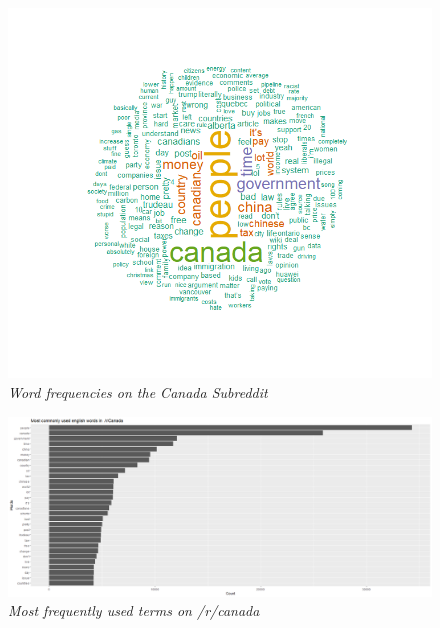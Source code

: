 \begin{figure}[ht]
    \centering
    \includegraphics[width=1.0\textwidth]{graphs/Canada/Wordcloud_canada.png}
    \caption{\textit{Word frequencies on the Canada Subreddit}}
    \label{fig:canada_cloud}
\end{figure}

\begin{figure}[H]
    \centering
    \includegraphics[width=1.0\textwidth]{graphs/Canada/WordFreq_Canada.png}
    \caption{\textit{Most frequently used terms on /r/canada}}
    \label{fig:canada_wordfreq}
\end{figure}

